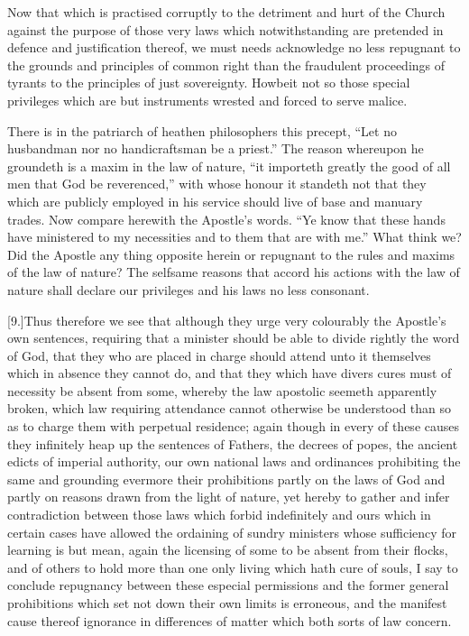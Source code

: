 Now that which is practised corruptly to the detriment and hurt of the Church against the purpose of those very laws which notwithstanding are pretended in defence and justification thereof, we must needs acknowledge no less repugnant to the grounds and principles of common right than the fraudulent proceedings of tyrants to the principles of just sovereignty. Howbeit not so those special privileges which are but instruments wrested and forced to serve malice.

There is in the patriarch of heathen philosophers this precept, “Let no husbandman nor no handicraftsman be a priest.” The reason whereupon he groundeth is a maxim in the law of nature, “it importeth greatly the good of all men that God be reverenced,” with whose honour it standeth not that they which are publicly employed in his service should live of base and manuary trades. Now compare herewith the Apostle’s words. “Ye know that these hands have ministered to my necessities and to them that are with me.” What think we? Did the Apostle any thing opposite herein or repugnant to the rules and maxims of the law of nature? The selfsame reasons that accord his actions with the law of nature shall declare our privileges and his laws no less consonant.

[9.]Thus therefore we see that although they urge very colourably the Apostle’s own sentences, requiring that a minister should be able to divide rightly the word of God, that they who are placed in charge should attend unto it themselves  which in absence they cannot do,
 and that they which have divers cures must of necessity be absent from some, whereby the law apostolic seemeth apparently broken, which law requiring attendance cannot otherwise be understood than so as to charge them with perpetual residence; again though in every of these causes they infinitely heap up the sentences of Fathers, the decrees of popes, the ancient edicts of imperial authority, our own national laws and ordinances prohibiting the same and grounding evermore their prohibitions partly on the laws of God and partly on reasons drawn from the light of nature, yet hereby to gather and infer contradiction between those laws which forbid indefinitely and ours which in certain cases have allowed the ordaining of sundry ministers whose sufficiency for learning is but mean, again the licensing of some to be absent from their flocks, and of others to hold more than one only living which hath cure of souls, I say to conclude repugnancy between these especial permissions and the former general prohibitions which set not down their own limits is erroneous, and the manifest cause thereof ignorance in differences of matter which both sorts of law concern.

